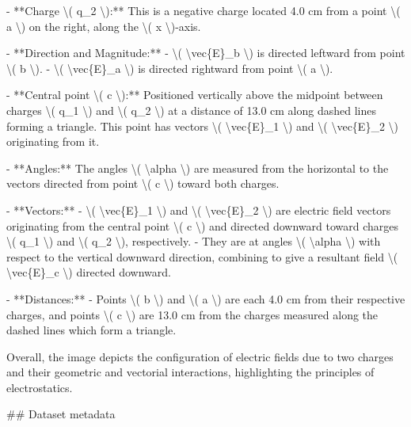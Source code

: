 - **Charge \textbackslash{}( q\_2 \textbackslash{}):** This is a negative charge located 4.0 cm from a point \textbackslash{}( a \textbackslash{}) on the right, along the \textbackslash{}( x \textbackslash{})-axis.

- **Direction and Magnitude:** 
  - \textbackslash{}( \textbackslash{}vec\{E\}\_b \textbackslash{}) is directed leftward from point \textbackslash{}( b \textbackslash{}).
  - \textbackslash{}( \textbackslash{}vec\{E\}\_a \textbackslash{}) is directed rightward from point \textbackslash{}( a \textbackslash{}).

- **Central point \textbackslash{}( c \textbackslash{}):** Positioned vertically above the midpoint between charges \textbackslash{}( q\_1 \textbackslash{}) and \textbackslash{}( q\_2 \textbackslash{}) at a distance of 13.0 cm along dashed lines forming a triangle. This point has vectors \textbackslash{}( \textbackslash{}vec\{E\}\_1 \textbackslash{}) and \textbackslash{}( \textbackslash{}vec\{E\}\_2 \textbackslash{}) originating from it.
  
- **Angles:** The angles \textbackslash{}( \textbackslash{}alpha \textbackslash{}) are measured from the horizontal to the vectors directed from point \textbackslash{}( c \textbackslash{}) toward both charges.

- **Vectors:**
  - \textbackslash{}( \textbackslash{}vec\{E\}\_1 \textbackslash{}) and \textbackslash{}( \textbackslash{}vec\{E\}\_2 \textbackslash{}) are electric field vectors originating from the central point \textbackslash{}( c \textbackslash{}) and directed downward toward charges \textbackslash{}( q\_1 \textbackslash{}) and \textbackslash{}( q\_2 \textbackslash{}), respectively. 
  - They are at angles \textbackslash{}( \textbackslash{}alpha \textbackslash{}) with respect to the vertical downward direction, combining to give a resultant field \textbackslash{}( \textbackslash{}vec\{E\}\_c \textbackslash{}) directed downward.

- **Distances:** 
  - Points \textbackslash{}( b \textbackslash{}) and \textbackslash{}( a \textbackslash{}) are each 4.0 cm from their respective charges, and points \textbackslash{}( c \textbackslash{}) are 13.0 cm from the charges measured along the dashed lines which form a triangle.

Overall, the image depicts the configuration of electric fields due to two charges and their geometric and vectorial interactions, highlighting the principles of electrostatics.

\#\# Dataset metadata


